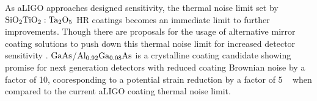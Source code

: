 %
%
%
%



As aLIGO approaches designed sensitivity, the thermal noise limit set by $\mathrm{SiO_2}\mathrm{TiO_2:Ta_2O_5}$ HR coatings becomes an immediate limit to further improvements. Though there are proposals for the usage of alternative mirror coating solutions to push down this thermal noise limit for increased detector sensitivity \cite{harry:aigwd2019}. $\mathrm{GaAs}$/$\mathrm{Al_{0.92}Ga_{0.08}As}$ is a crystalline coating candidate showing promise for next generation detectors with reduced coating Brownian noise by a factor of 10, cooresponding to a potential strain reduction by a factor of 5 ~\cite{cole:2013} when compared to the current aLIGO coating thermal noise limit. 

